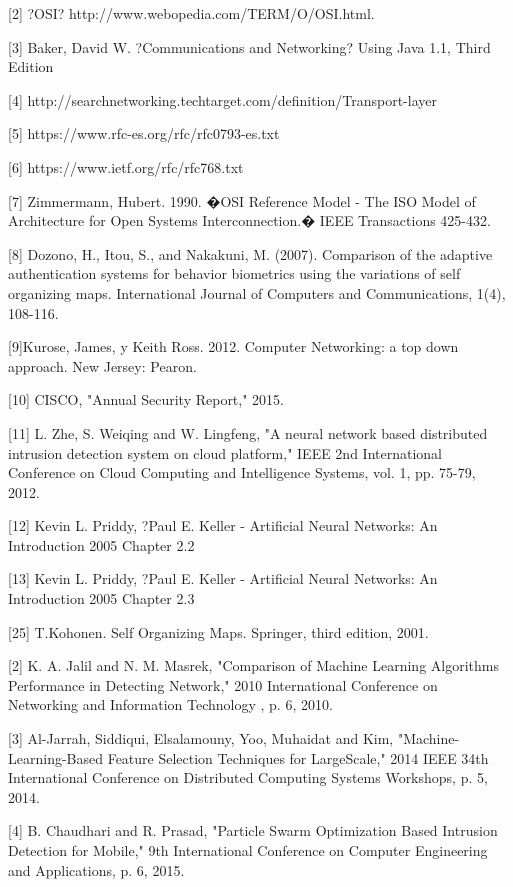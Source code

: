 \documentclass{article}
\begin{document}
[2] ?OSI? http://www.webopedia.com/TERM/O/OSI.html.

[3] Baker, David W. ?Communications and Networking? Using Java 1.1, Third Edition

[4] http://searchnetworking.techtarget.com/definition/Transport-layer

[5] https://www.rfc-es.org/rfc/rfc0793-es.txt

[6] https://www.ietf.org/rfc/rfc768.txt

[7] Zimmermann, Hubert. 1990. �OSI Reference Model - The ISO Model of Architecture for Open Systems Interconnection.� IEEE Transactions 425-432.

[8] Dozono, H., Itou, S., and Nakakuni, M. (2007). Comparison of the adaptive authentication systems for behavior biometrics using the variations of self organizing maps. International 
Journal of Computers and Communications, 1(4), 108-116.

[9]Kurose, James, y Keith Ross. 2012. Computer Networking: a top down approach. New
Jersey: Pearon.

[10] CISCO, "Annual Security Report," 2015.

[11] L. Zhe, S. Weiqing and W. Lingfeng, "A neural network based distributed intrusion detection system on cloud platform," IEEE 2nd International Conference on Cloud Computing and Intelligence Systems, vol. 1, pp. 75-79, 2012.

[12] Kevin L. Priddy, ?Paul E. Keller - Artificial Neural Networks: An Introduction 2005 Chapter 2.2

[13] Kevin L. Priddy, ?Paul E. Keller - Artificial Neural Networks: An Introduction 2005 Chapter 2.3

[25] T.Kohonen. Self Organizing Maps. Springer, third edition, 2001.





[2] K. A. Jalil and N. M. Masrek, "Comparison of Machine Learning Algorithms Performance in Detecting Network," 2010 International Conference on Networking and Information Technology , p. 6, 2010. 

[3] Al-Jarrah, Siddiqui, Elsalamouny, Yoo, Muhaidat and Kim, "Machine-Learning-Based Feature Selection Techniques for LargeScale," 2014 IEEE 34th International Conference on Distributed Computing Systems Workshops, p. 5, 2014. 

[4] B. Chaudhari and R. Prasad, "Particle Swarm Optimization Based Intrusion Detection for Mobile," 9th International Conference on Computer Engineering and Applications, p. 6, 2015. 
\end{document}
